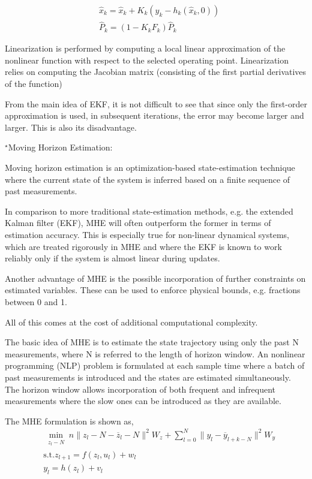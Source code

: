 \documentclass[a4paper,11pt,reqno]{amsart}
\begin{document}
$$
\begin{aligned}
    &\hat{x}_k=\hat{x}_k+K_k(y_k-h_k(\hat{x}_k,0))
    \\
    &\hat{P}_k=(1-K_kF_k)\hat{P}_k
\end{aligned}
$$

Linearization is performed by computing a local linear approximation of the nonlinear function with respect to the selected operating point.
Linearization relies on computing the Jacobian matrix (consisting of the first partial derivatives of the function)

From the main idea of EKF, it is not difficult to see that since only the first-order 
approximation is used, in subsequent iterations, the error may become larger and larger. 
This is also its disadvantage.

\vspace{2em}

$^{\star}$Moving Horizon Estimation:

Moving horizon estimation is an optimization-based state-estimation technique where the 
current state of the system is inferred based on a finite sequence of past measurements.

In comparison to more traditional state-estimation methods, e.g. the extended Kalman filter (EKF), 
MHE will often outperform the former in terms of estimation accuracy. 
This is especially true for non-linear dynamical systems, 
which are treated rigorously in MHE and where the EKF is known to work reliably only if the 
system is almost linear during updates.

Another advantage of MHE is the possible incorporation of further constraints on estimated 
variables. These can be used to enforce physical bounds, e.g. fractions between 0 and 1.

All of this comes at the cost of additional computational complexity.

The basic idea of MHE is to estimate the state trajectory using only the past N measurements, 
where N is referred to the length of horizon window. An nonlinear programming (NLP) problem is 
formulated at each sample time where a batch of past measurements is introduced and the states 
are estimated simultaneously. The horizon window allows incorporation of both frequent and 
infrequent measurements where the slow ones can be introduced as they are available.

The MHE formulation is shown as,
\begin{subequations}
    \begin{align}
    &\min_{\substack{z_l-N}}n\|z_l-N-  \overline{z}_l-N\|^2W_z+\sum^N_{l=0}\|y_l- \overline{y}_{l+k-N}\|^2W_y
    \label{20a}
    \\
    &\text{s.t.}z_{l+1}=f(z_l,u_l)+w_l
    \label{20b}
    \\
    &y_l=h(z_l)+v_l
    \label{20c}
    \end{align}
\end{subequations}
\end{document}
